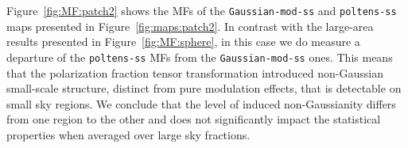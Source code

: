 \documentclass[twocolumn]{aastex631}
\newcommand{\giuse}[1]{\textcolor{orange}{(GP: #1)}}
\begin{document}
Figure~\ref{fig:MF:patch2} shows the MFs of the \texttt{Gaussian-mod-ss} and \texttt{poltens-ss} maps presented in Figure~\ref{fig:maps:patch2}. In contrast with the large-area results presented in Figure~\ref{fig:MF:sphere}, in this case we do measure a departure of the \texttt{poltens-ss} MFs from the \texttt{Gaussian-mod-ss} ones. %
This means that the polarization fraction tensor transformation introduced non-Gaussian small-scale structure, distinct from pure modulation effects, that is detectable on small sky regions. 
We conclude that the level of induced non-Gaussianity differs from one region to the other and does not significantly impact the statistical properties when averaged over large sky fractions.


\end{document}
